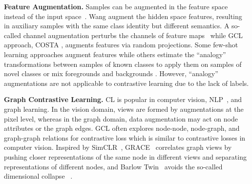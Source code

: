 \vspace{0.1cm}
\noindent\textbf{Feature Augmentation.} Samples can be augmented in the feature space instead of the input space~\citep{feng2021survey}. Wang \etal \citep{wang2019implicit} augment the hidden space features, resulting in auxiliary samples with the same class identity but different semantics. A so-called channel augmentation  perturbs the channels of feature maps~\citep{wang2019implicit} while  GCL approach, COSTA \cite{zhang2022costa}, augments features via random projections. Some few-shot learning approaches augment features  \cite{Zhang_2022_CVPR} while others  estimate the ``analogy'' transformations between samples of known classes to apply them on samples of novel classes \citep{hariharan2017low,schwartz2018delta} or mix foregrounds and backgrounds \cite{zhang2019few}. 
However, ``analogy'' augmentations are not applicable to contrastive learning due to the lack of labels.  %

\vspace{0.1cm}
\noindent\textbf{Graph Contrastive Learning.} 
CL is popular in computer vision, NLP~\citep{he2020momentum, chen2020simple, gao2021simcse}, and graph learning. %
In the vision domain,  views are formed by augmentations at the pixel level, whereas in the graph domain, data augmentation may act on node attributes or the graph edges. %
GCL often explores node-node, node-graph, and graph-graph relations for contrastive loss which is similar to contrastive losses in computer vision. Inspired by SimCLR~\citep{chen2020simple}, GRACE~\citep{zhu2020deep}  correlates graph views by pushing closer representations of the same node in different views and separating representations of different nodes, and  Barlow Twin~\citep{zbontar2021barlow}   avoids the so-called dimensional collapse %
~\citep{jing2021understanding}. %

